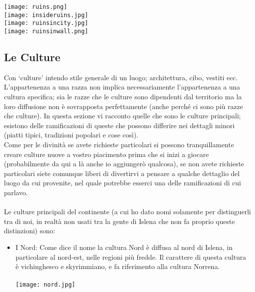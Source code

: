 \documentclass[a4paper]{report}
\begin{document}
\begin{multicols}{2}
\texttt{[image: ruins.png]}\\

\texttt{[image: insideruins.jpg]}\\

\texttt{[image: ruinsincity.jpg]}\\

\texttt{[image: ruinsinwall.png]}\\
\end{multicols}

\newpage
\begin{multicols}{2}
\section{Le Culture} 
Con \enquote*{culture} intendo stile generale di un luogo; architettura, cibo, vestiti ecc. L’appartenenza a una razza non implica necessariamente l’appartenenza a una cultura specifica; sia le razze che le culture sono dipendenti dal territorio ma la loro diffusione non è sovrapposta perfettamente (anche perché ci sono più razze che culture). In questa sezione vi racconto quelle che sono le culture principali; esistono delle ramificazioni di queste che possono differire nei dettagli minori (piatti tipici, tradizioni popolari e cose così).\\
Come per le divinità se avete richieste particolari si possono tranquillamente creare culture nuove a vostro piacimento prima che si inizi a giocare (probabilmente da qui a là anche io aggiungerò qualcosa), se non avete richieste particolari siete comunque liberi di divertirvi a pensare a qualche dettaglio del luogo da cui provenite, nel quale potrebbe esserci una delle ramificazioni di cui parlavo. \\
\\
Le culture principali del continente (a cui	ho dato nomi solamente per distinguerli tra di noi, in realtà non usati tra la gente di Islena che non fa proprio queste distinzioni) sono:\\

\begin{itemize}
	\item I Nord: Come dice il nome la cultura Nord è diffusa al nord di Islena, in particolare al nord-est, nelle regioni più fredde. Il carattere di questa cultura è vichinghesco e skyrimmiano, e fa riferimento alla cultura Norrena.\\
	\\
	\texttt{[image: nord.jpg]}
	\\
	\\
	

\end{itemize}
\end{multicols}
\end{document}
